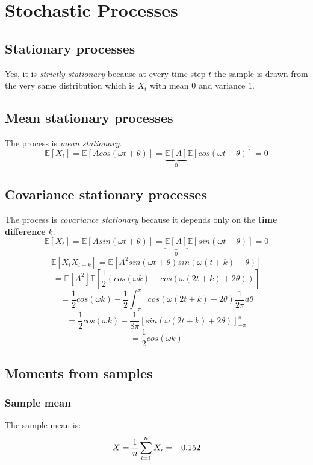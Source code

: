 \documentclass{assignment}
\date{\today}
\begin{document}

\section{Stochastic Processes}

\subsection{Stationary processes}
\noindent Yes, it is \emph{strictly stationary} because at every time step $t$ the sample is drawn from the very same distribution which is $X_t$ with mean $0$ and variance $1$.

\subsection{Mean stationary processes}
\noindent The process is \emph{mean stationary}.
$$ \mathbb{E}[X_t] = \mathbb{E}[Acos\left(\omega t + \theta\right)] = \underbrace{\mathbb{E}[A]}_0\mathbb{E}[cos\left(\omega t + \theta\right)] = 0$$


\subsection{Covariance stationary processes}
\noindent The process is \emph{covariance stationary} because it depends only on the \textbf{time difference} $k$.
$$ \mathbb{E}[X_t]  = \mathbb{E}[Asin(\omega t + \theta)] = \underbrace{\mathbb{E}[A]}_0\mathbb{E}[sin(\omega t + \theta )] = 0$$
$$ \mathbb{E}[X_t X_{t+k}] = \mathbb{E}[A^2sin(\omega t + \theta)sin\left( \omega \left(t + k \right) + \theta \right)] $$
$$= \mathbb{E}[A^2] \mathbb{E}\left[ \frac{1}{2}(cos(\omega k) - cos(\omega (2t+k) + 2\theta)) \right]$$
$$= \frac{1}{2} cos(\omega k) - \frac{1}{2}\int_{-\pi}^{\pi}cos\left( \omega(2t+k)+2\theta \right)\frac{1}{2\pi}d\theta$$
$$= \frac{1}{2}cos(\omega k)-\frac{1}{8\pi}\left[ sin(\omega (2t+k)+2\theta) \right]_{-\pi}^\pi$$
$$ = \frac{1}{2}cos(\omega k)$$

\subsection{Moments from samples}
\subsubsection{Sample mean}
The sample mean is:
$$\Bar{X} = \frac{1}{n}\sum_{i=1}^{n}X_i = -0.152$$
\end{document}
